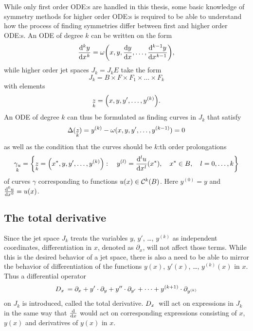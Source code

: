 While only first order ODE:s are handled in this thesis, some basic knowledge of symmetry methods for higher order ODE:s is required to be able to understand how the process of finding symmetries differ between first and higher order ODE:s.
An ODE of degree \(k\) can be written on the form
\begin{equation*}
  \diff[k]{y}{x} = \omega\left(x, y, \diff{y}{x}, \dots, \diff[k-1]{y}{x}\right),
\end{equation*}
while higher order jet spaces \(J_k = J_k E\) take the form
\begin{equation*}
  J_k = B \times F \times F_1 \times \dots \times F_k
\end{equation*}
with elements
\begin{equation*}
  \prolong{z}{k} = \left(x, y, y', \dots, y^{(k)}\right).
\end{equation*}
An ODE of degree \(k\) can thus be formulated as finding curves in \(J_k\) that satisfy
\begin{equation*}
  \Delta(\prolong{z}{k}) = y^{(k)} - \omega(x, y, y', \dots, y^{(k-1)}) = 0
\end{equation*}
as well as the condition that the curves should be \(k\):th order prolongations
\begin{equation*}
  \prolong{\gamma_u}{k} = \left\{\prolong{z}{k} = \left(\fixed{x}, y, y', \dots, y^{(k)}\right):\quad y^{(l)} = \diff[l]{u}{x}{(\fixed{x})},\quad \fixed{x} \in B,\quad l = 0, \dots, k\right\}
\end{equation*}
of curves \(\gamma\) corresponding to functions \(u(x) \in \cont{k}{B}\).
Here \(y^{(0)} = y\) and \(\diff[0]{u}{x} = u(x)\).

\subsection{The total derivative}

Since the jet space \(J_k\) treats the variables \(y\), \(y'\), \dots, \(y^{(k)}\) as independent coordinates, differentiation in \(x\), denoted as \(\partial_x\), will not affect those terms.
While this is the desired behavior of a jet space, there is also a need to be able to mirror the behavior of differentiation of the functions \(y(x)\), \(y'(x)\), \dots, \(y^{(k)}(x)\) in \(x\).
Thus a differential operator
\begin{equation*}
  \tD{x} = \partial_x + y' \cdot \partial_y + y'' \cdot \partial_{y'} + \dots + y^{(k+1)} \cdot \partial_{y^{(k)}}
\end{equation*}
on \(J_k\) is introduced, called the total derivative.
\(\tD{x}\) will act on expressions in \(J_k\) in the same way that \(\diff*{}{x}\) would act on corresponding expressions consisting of \(x\), \(y(x)\) and derivatives of \(y(x)\) in \(x\).

